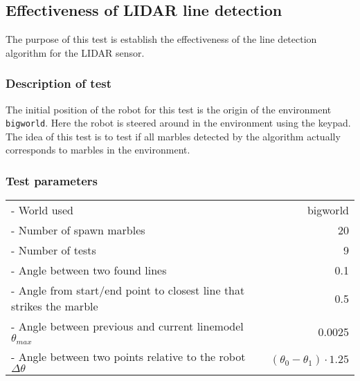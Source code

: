 \documentclass[../Head/Main.tex]{subfiles}
\begin{document}
\subsection{Effectiveness of LIDAR line detection}

The purpose of this test is establish the effectiveness of the line detection algorithm for the LIDAR sensor.

\subsubsection*{Description of test}
The initial position of the robot for this test is the origin of the environment \texttt{bigworld}. Here the robot is steered around in the environment using the keypad. The idea of this test is to test if all marbles detected by the algorithm actually corresponds to marbles in the environment.     

\subsubsection*{Test parameters}
\begin{tabular}{l r}
	- World used                & bigworld\\	
	- Number of spawn marbles   & 20\\
	- Number of tests           & 9\\
	- Angle between two found lines & 0.1\\
	- Angle from start/end point to closest line that strikes the marble & 0.5\\
	- Angle between previous and current linemodel $\theta_{max}$ & 0.0025 \\
	- Angle between two points relative to the robot $\Delta\theta$ & $\left(\theta_0 - \theta_1\right) \cdot 1.25$ 
\end{tabular}
\end{document}
